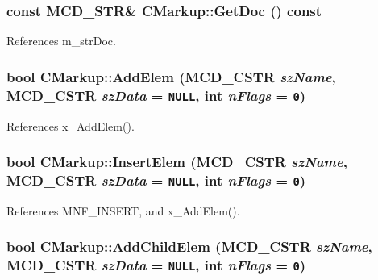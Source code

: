 \subsubsection[GetDoc]{\setlength{\rightskip}{0pt plus 5cm}const MCD\_\-STR\& CMarkup::GetDoc () const\hspace{0.3cm}{\tt  [inline]}}\label{classCMarkup_04364a3697a67d5652b2259bd8b17889}




References m\_\-strDoc.
\subsubsection[AddElem]{\setlength{\rightskip}{0pt plus 5cm}bool CMarkup::AddElem ({\bf MCD\_\-CSTR} {\em szName}, \/  {\bf MCD\_\-CSTR} {\em szData} = {\tt NULL}, \/  int {\em nFlags} = {\tt 0})\hspace{0.3cm}{\tt  [inline]}}\label{classCMarkup_4662396e9424b09566bdcc678ad9dd74}




References x\_\-AddElem().
\subsubsection[InsertElem]{\setlength{\rightskip}{0pt plus 5cm}bool CMarkup::InsertElem ({\bf MCD\_\-CSTR} {\em szName}, \/  {\bf MCD\_\-CSTR} {\em szData} = {\tt NULL}, \/  int {\em nFlags} = {\tt 0})\hspace{0.3cm}{\tt  [inline]}}\label{classCMarkup_becf9cd13700fc16d44bef412d76beaf}




References MNF\_\-INSERT, and x\_\-AddElem().
\subsubsection[AddChildElem]{\setlength{\rightskip}{0pt plus 5cm}bool CMarkup::AddChildElem ({\bf MCD\_\-CSTR} {\em szName}, \/  {\bf MCD\_\-CSTR} {\em szData} = {\tt NULL}, \/  int {\em nFlags} = {\tt 0})\hspace{0.3cm}{\tt  [inline]}}\label{classCMarkup_013e1b40382e8d06410f8a7e823976a1}




